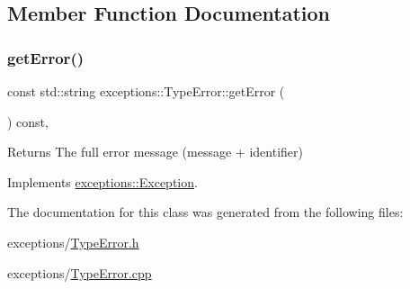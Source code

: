 \subsection{Member Function Documentation}
\mbox{\label{classexceptions_1_1TypeError_aea887128840ec0cab163fe3272418542}} 
\subsubsection{\texorpdfstring{get\+Error()}{getError()}}
{\footnotesize\ttfamily const std\+::string exceptions\+::\+Type\+Error\+::get\+Error (\begin{DoxyParamCaption}{ }\end{DoxyParamCaption}) const\hspace{0.3cm}{\ttfamily [override]}, {\ttfamily [virtual]}}

\begin{DoxyReturn}{Returns}
The full error message (message + identifier) 
\end{DoxyReturn}


Implements \hyperlink{classexceptions_1_1Exception}{exceptions\+::\+Exception}.



The documentation for this class was generated from the following files\+:\begin{DoxyCompactItemize}
\item 
exceptions/\hyperlink{TypeError_8h}{Type\+Error.\+h}\item 
exceptions/\hyperlink{TypeError_8cpp}{Type\+Error.\+cpp}\end{DoxyCompactItemize}
